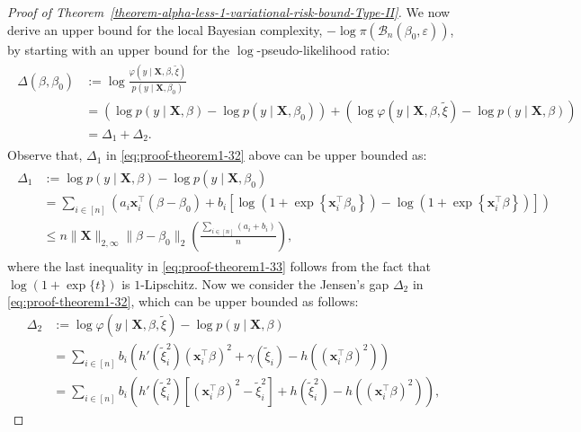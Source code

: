 \documentclass[12pt]{article}
\numberwithin{equation}{section}
\begin{document}
\begin{proof}[Proof of Theorem~\ref{theorem-alpha-less-1-variational-risk-bound-Type-II}]
%
We now derive an upper bound for the local Bayesian complexity, $-\log \pi(\mathcal{B}_n(\beta_0, \varepsilon))$, by starting with an upper bound for the $\log$-pseudo-likelihood ratio:
\begin{align}\label{eq:proof-theorem1-32}
    \begin{split}
        \Delta(\beta, \beta_0) &:= \log \frac{\varphi(y\mid \mathbf{X}, \beta, \tilde{\xi})}{p(y\mid \mathbf{X}, \beta_0)}\\
        &= \left(\log p(y\mid \mathbf{X}, \beta) - \log p(y\mid \mathbf{X}, \beta_0)\right) + \left(\log \varphi(y\mid \mathbf{X}, \beta, \tilde{\xi}) - \log p(y\mid \mathbf{X}, \beta)\right)\\
        &= \Delta_1 +\Delta_2.
    \end{split}
\end{align}
Observe that, $\Delta_1$ in \eqref{eq:proof-theorem1-32} above can be upper bounded as:
\begin{align}\label{eq:proof-theorem1-33}
\begin{split}
        \Delta_1 &:= \log p(y\mid \mathbf{X}, \beta) - \log p(y\mid \mathbf{X}, \beta_{0})\\
        &= \sum_{i \in [n]}\left(a_i\mathbf{x}_i^{\top}(\beta-\beta_0) + b_i\left[\log\left(1 + \exp\left\{\mathbf{x}_i^\top\beta_0\right\}\right) - \log\left(1 + \exp\left\{\mathbf{x}_i^\top\beta\right\}\right)\right]\right)\\
        &\leq n\lVert \mathbf{X}\rVert_{2, \infty}\lVert \beta-\beta_0\rVert_2\left(\frac{\sum_{i\in [n]} (a_i+b_i)}{n}\right),
\end{split}
\end{align}
where the last inequality in \eqref{eq:proof-theorem1-33} follows from the fact that $\log(1 + \exp\{t\})$ is $1$-Lipschitz.
Now we consider the Jensen's gap $\Delta_2$ in \eqref{eq:proof-theorem1-32}, which can be upper bounded as follows:
\begin{equation}\label{eq:proof-theorem1-34}
    \begin{split}
        \Delta_2 &:= \log \varphi(y\mid \mathbf{X}, \beta, \tilde{\xi}) - \log p(y\mid \mathbf{X}, \beta)\\
        &= \sum_{i\in [n]} b_i\left(h'(\tilde{\xi}_i^2) (\mathbf{x}_i^{\top}\beta)^2 + \gamma(\tilde{\xi}_i) - h((\mathbf{x}_i^{\top}\beta)^2)\right)\\
        &= \sum_{i\in [n]}b_i\left(h'(\tilde{\xi}_i^2)\left[(\mathbf{x}_i^{\top}\beta)^2 - \tilde{\xi}_i^2\right] + h(\tilde{\xi}_i^2) - h((\mathbf{x}_i^{\top}\beta)^2)\right),

\end{split}
\end{equation}
\end{proof}
\end{document}
